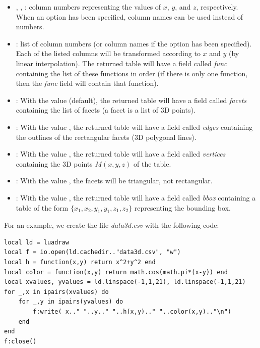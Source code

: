 \begin{itemize}
\begin{itemize}
        \item {}, , : column numbers representing the values ​​of $x$, $y$, and $z$, respectively. When an  option has been specified, column names can be used instead of numbers.

        \item {}: list of column numbers (or column names if the  option has been specified). Each of the listed columns will be transformed according to $x$ and $y$ (by linear interpolation). The returned table will have a field called \emph{func} containing the list of these functions in order (if there is only one function, then the \emph{func} field will contain that function).

        \item {}: With the value \true (default), the returned table will have a field called \emph{facets} containing the list of facets (a facet is a list of 3D points).

        \item {}: With the value \true, the returned table will have a field called \emph{edges} containing the outlines of the rectangular facets (3D polygonal lines).

        \item {}: With the value \true, the returned table will have a field called \emph{vertices} containing the 3D points $M(x,y,z)$ of the table.

        \item {}: With the value \true, the facets will be triangular, not rectangular.

        \item {}: With the value \true, the returned table will have a field called \emph{bbox} containing a table of the form $\{x_1,x_2,y_1,y_1,z_1,z_2\}$ representing the bounding box.
    \end{itemize}
\end{itemize}

For an example, we create the file \emph{data3d.csv} with the following code:

\begin{verbatim}
local ld = luadraw
local f = io.open(ld.cachedir.."data3d.csv", "w")
local h = function(x,y) return x^2+y^2 end
local color = function(x,y) return math.cos(math.pi*(x-y)) end
local xvalues, yvalues = ld.linspace(-1,1,21), ld.linspace(-1,1,21)
for _,x in ipairs(xvalues) do
    for _,y in ipairs(yvalues) do
        f:write( x.." "..y.." "..h(x,y).." "..color(x,y).."\n")
    end
end
f:close()
\end{verbatim}

